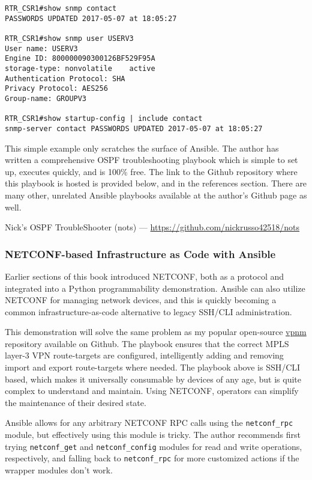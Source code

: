 \begin{verbatim}
RTR_CSR1#show snmp contact
PASSWORDS UPDATED 2017-05-07 at 18:05:27

RTR_CSR1#show snmp user USERV3
User name: USERV3
Engine ID: 800000090300126BF529F95A
storage-type: nonvolatile	 active
Authentication Protocol: SHA
Privacy Protocol: AES256
Group-name: GROUPV3

RTR_CSR1#show startup-config | include contact
snmp-server contact PASSWORDS UPDATED 2017-05-07 at 18:05:27
\end{verbatim}

This simple example only scratches the surface of Ansible. The author has
written a comprehensive OSPF troubleshooting playbook which is simple to set
up, executes quickly, and is 100\% free. The link to the Github repository
where this playbook is hosted is provided below, and in the references
section. There are many other, unrelated Ansible playbooks available at the
author's Github page as well.

Nick's OSPF TroubleShooter (nots) --- \url{https://github.com/nickrusso42518/nots}

\subsubsection{NETCONF-based Infrastructure as Code with Ansible}
Earlier sections of this book introduced NETCONF, both as a protocol and
integrated into a Python programmability demonstration. Ansible can also
utilize  NETCONF for managing network devices, and this is quickly becoming
a common infrastructure-as-code alternative to legacy SSH/CLI administration.

This demonstration will solve the same problem as my popular open-source
\href{https://github.com/nickrusso42518/vpnm}{vpnm} repository available on Github.
The playbook ensures that the correct MPLS layer-3 VPN route-targets are configured,
intelligently adding and removing import and export route-targets where needed.
The playbook above is SSH/CLI based, which makes it universally consumable by
devices of any age, but is quite complex to understand and maintain. Using
NETCONF, operators can simplify the maintenance of their desired state.

Ansible allows for any arbitrary NETCONF RPC calls using the \verb|netconf_rpc|
module, but effectively using this module is tricky. The author recommends
first trying \verb|netconf_get| and \verb|netconf_config| modules for read and
write operations, respectively, and falling back to \verb|netconf_rpc| for
more customized actions if the wrapper modules don't work.

